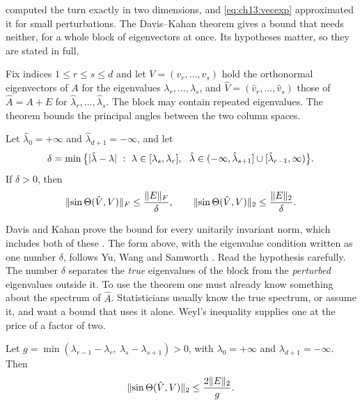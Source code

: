  computed the turn exactly in two dimensions, and
\cref{eq:ch13:vecexp} approximated it for small perturbations. The Davis--Kahan
theorem gives a bound that needs neither, for a whole block of eigenvectors at
once. Its hypotheses matter, so they are stated in full.

Fix indices $1\le r\le s\le d$ and let $V=(v_r,\dots,v_s)$ hold the orthonormal
eigenvectors of $A$ for the eigenvalues $\lambda_r,\dots,\lambda_s$, and
$\hat V=(\hat v_r,\dots,\hat v_s)$ those of $\hat A=A+E$ for
$\hat\lambda_r,\dots,\hat\lambda_s$. The block may contain repeated eigenvalues.
The theorem bounds the principal angles between the two column spaces.

\begin{theorem}\label{thm:ch13:dk}
Let $\hat\lambda_0=+\infty$ and $\hat\lambda_{d+1}=-\infty$, and let
\begin{equation}\label{eq:ch13:delta}
\delta=\min\big\{\abs{\hat\lambda-\lambda}\ :\ \lambda\in[\lambda_s,\lambda_r],\ \
\hat\lambda\in(-\infty,\hat\lambda_{s+1}]\cup[\hat\lambda_{r-1},\infty)\big\}.
\end{equation}
If $\delta>0$, then
\begin{equation}\label{eq:ch13:dk}
\lVert \sin\Theta(\hat V,V)\rVert_F\le\frac{\lVert E\rVert_F}{\delta},\qquad
\lVert \sin\Theta(\hat V,V)\rVert_2\le\frac{\lVert E\rVert_2}{\delta}.
\end{equation}
\end{theorem}

Davis and Kahan prove the bound for every unitarily invariant norm, which
includes both of these \cite{daviskahan1970}. The form above, with the
eigenvalue condition written as one number $\delta$, follows Yu, Wang and
Samworth \cite{yuwangsamworth2015}. Read the hypothesis carefully. The number
$\delta$ separates the \emph{true} eigenvalues of the block from the
\emph{perturbed} eigenvalues outside it. To use the theorem one must already know
something about the spectrum of $\hat A$. Statisticians usually know the true
spectrum, or assume it, and want a bound that uses it alone. Weyl's inequality
supplies one at the price of a factor of two.

\begin{proposition}\label{prop:ch13:dkpop}
Let $g=\min(\lambda_{r-1}-\lambda_r,\ \lambda_s-\lambda_{s+1})>0$, with
$\lambda_0=+\infty$ and $\lambda_{d+1}=-\infty$. Then
\begin{equation}\label{eq:ch13:dkpop}
\lVert \sin\Theta(\hat V,V)\rVert_2\le\frac{2\lVert E\rVert_2}{g}.
\end{equation}
\end{proposition}


